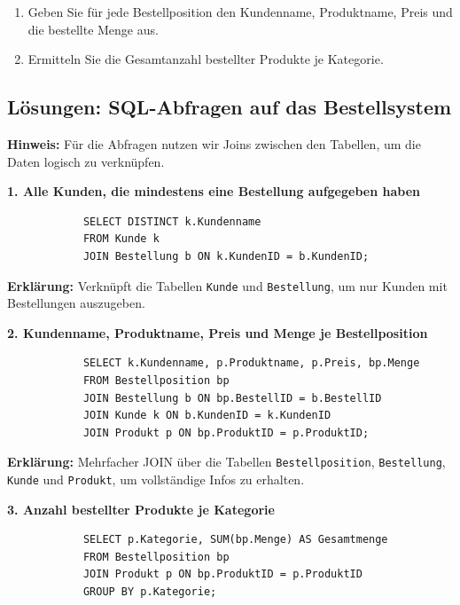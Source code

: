 \documentclass[a4paper,12pt]{article}
\begin{document}
\begin{enumerate}
\begin{enumerate}
			\item Geben Sie für jede Bestellposition den Kundenname, Produktname, Preis und die bestellte Menge aus.
			
			\item Ermitteln Sie die Gesamtanzahl bestellter Produkte je Kategorie.
		\end{enumerate}
		
		\subsection*{Lösungen: SQL-Abfragen auf das Bestellsystem}
		
		\textbf{Hinweis:} Für die Abfragen nutzen wir Joins zwischen den Tabellen, um die Daten logisch zu verknüpfen.
		
		\vspace{1em}
		
		\textbf{1. Alle Kunden, die mindestens eine Bestellung aufgegeben haben}
		
		\begin{verbatim}
			SELECT DISTINCT k.Kundenname
			FROM Kunde k
			JOIN Bestellung b ON k.KundenID = b.KundenID;
		\end{verbatim}
		
		\textbf{Erklärung:}  
		Verknüpft die Tabellen \texttt{Kunde} und \texttt{Bestellung}, um nur Kunden mit Bestellungen auszugeben.
		
		\vspace{1em}
		
		\textbf{2. Kundenname, Produktname, Preis und Menge je Bestellposition}
		
		\begin{verbatim}
			SELECT k.Kundenname, p.Produktname, p.Preis, bp.Menge
			FROM Bestellposition bp
			JOIN Bestellung b ON bp.BestellID = b.BestellID
			JOIN Kunde k ON b.KundenID = k.KundenID
			JOIN Produkt p ON bp.ProduktID = p.ProduktID;
		\end{verbatim}
		
		\textbf{Erklärung:}  
		Mehrfacher JOIN über die Tabellen \texttt{Bestellposition}, \texttt{Bestellung}, \texttt{Kunde} und \texttt{Produkt}, um vollständige Infos zu erhalten.
		
		\vspace{1em}
		
		\textbf{3. Anzahl bestellter Produkte je Kategorie}
		
		\begin{verbatim}
			SELECT p.Kategorie, SUM(bp.Menge) AS Gesamtmenge
			FROM Bestellposition bp
			JOIN Produkt p ON bp.ProduktID = p.ProduktID
			GROUP BY p.Kategorie;
		\end{verbatim}
		

\end{enumerate}
\end{document}
